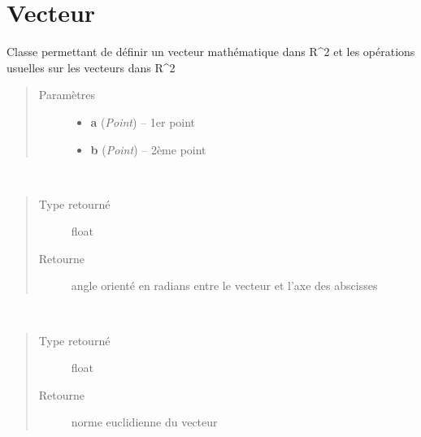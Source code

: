 \documentclass[letterpaper,10pt,french]{sphinxmanual}
\begin{document}
\section{Vecteur}
\label{math:module-lib.math.vecteur}\label{math:vecteur}

\begin{fulllineitems}
\label{math:lib.math.vecteur.Vecteur}
Classe permettant de définir un vecteur mathématique dans R\textasciicircum{}2 et les opérations usuelles sur les vecteurs dans R\textasciicircum{}2
\begin{quote}\begin{description}
\item[{Paramètres}] \leavevmode\begin{itemize}
\item {} 
\textbf{a} (\emph{Point}) -- 1er point

\item {} 
\textbf{b} (\emph{Point}) -- 2ème point

\end{itemize}

\end{description}\end{quote}

\begin{fulllineitems}
\label{math:lib.math.vecteur.Vecteur.angle}~\begin{quote}\begin{description}
\item[{Type retourné}] \leavevmode
float

\item[{Retourne}] \leavevmode
angle orienté en radians entre le vecteur et l'axe des abscisses

\end{description}\end{quote}

\end{fulllineitems}


\begin{fulllineitems}
\label{math:lib.math.vecteur.Vecteur.norme}~\begin{quote}\begin{description}
\item[{Type retourné}] \leavevmode
float

\item[{Retourne}] \leavevmode
norme euclidienne du vecteur

\end{description}\end{quote}

\end{fulllineitems}


\end{fulllineitems}
\end{document}
